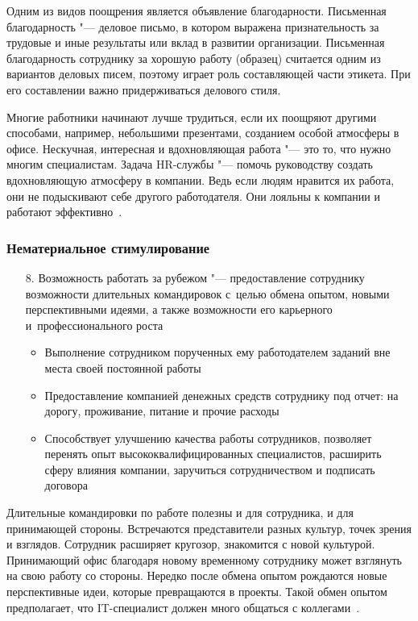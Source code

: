 \documentclass{../industrial-development}
\begin{document}
		\lecturenotes
		
Одним из видов поощрения является объявление благодарности. Письменная благодарность "--- деловое письмо, в котором выражена признательность за трудовые и иные результаты или вклад в развитии организации. Письменная благодарность сотруднику за хорошую работу (образец) считается одним из вариантов деловых писем, поэтому играет роль составляющей части этикета. При его составлении важно придерживаться делового стиля.

Многие работники начинают лучше трудиться, если их поощряют другими способами, например, небольшими презентами, созданием особой атмосферы в офисе. Нескучная, интересная и вдохновляющая работа "--- это то, что нужно многим специалистам. Задача HR-службы "--- помочь руководству создать вдохновляющую атмосферу в компании. Ведь если людям нравится их работа, они не подыскивают себе другого работодателя. Они лояльны к компании и работают эффективно~\cite{VchemosobenIT}.

\begin{frame} \frametitle{Нематериальное стимулирование}
	\begin{itemize}
	\item[8.] \alert{Возможность работать за рубежом} "--- предоставление сотруднику возможности длительных командировок с~целью обмена опытом, новыми перспективными идеями, а также возможности его карьерного и~профессионального роста				
	 \begin{itemize}
          \item Выполнение сотрудником порученных ему работодателем заданий вне места своей постоянной работы 
          \item Предоставление компанией денежных средств сотруднику под отчет: на дорогу, проживание, питание и прочие расходы
	\item Способствует улучшению качества работы сотрудников, позволяет перенять опыт высококвалифицированных специалистов, расширить сферу влияния компании, заручиться сотрудничеством и подписать договора
  \end{itemize}
  \end{itemize}
\end{frame}
		
		\lecturenotes
		
Длительные командировки по работе полезны и для сотрудника, и для принимающей стороны. Встречаются представители разных культур, точек зрения и взглядов. Сотрудник расширяет кругозор, знакомится с новой культурой. Принимающий офис благодаря новому временному сотруднику может взглянуть на свою работу со стороны. Нередко после обмена опытом рождаются новые перспективные идеи, которые превращаются в проекты. Такой обмен опытом предполагает, что IT-специалист должен много общаться с коллегами~\cite{VchemosobenIT}.
\end{document}
